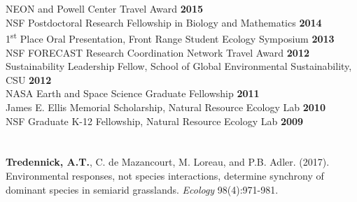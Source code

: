 \documentclass[margin,line]{resume}
\begin{document}
\begin{resume}
     \section{\textmd{\textsf{\color{MidnightBlue}{Fellowships \\and Awards}}}}
        		NEON and Powell Center Travel Award \hfill \textbf{2015}\vspace{.5mm}\\%
                NSF Postdoctoral Research Fellowship in Biology and Mathematics    \hfill \textbf{2014}\vspace{.5mm}\\%
                1\textsuperscript{st} Place Oral Presentation, Front Range Student Ecology Symposium  \hfill \textbf{2013}\vspace{.5mm}\\%
                NSF FORECAST Research Coordination Network Travel Award \hfill \textbf{2012}\vspace{.5mm}\\%
                Sustainability Leadership Fellow, School of Global Environmental Sustainability, CSU \hfill \textbf{2012}\vspace{.5mm}\\%
		NASA Earth and Space Science Graduate Fellowship  \hfill \textbf{2011}\vspace{.5mm}\\%
		James E. Ellis Memorial Scholarship, Natural Resource Ecology Lab  \hfill \textbf{2010}\vspace{.5mm}\\%
		NSF Graduate K-12 Fellowship, Natural Resource Ecology Lab                        \hfill\textbf{2009}%
   
      \section{\textmd{\textsf{\color{MidnightBlue}{Publications}}}}

      \textbf{Tredennick, A.T.}, C. de Mazancourt, M. Loreau, and P.B. Adler. (2017). Environmental responses, not species interactions, determine synchrony of dominant species in semiarid grasslands. \emph{Ecology} 98(4):971-981.
      

\end{resume}
\end{document}
